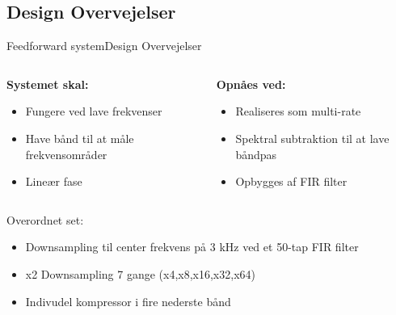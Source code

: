 \documentclass[10pt,aspectratio=169]{beamer}
\begin{document}
\subsection{Design Overvejelser}
\begin{frame}{Feedforward system}{Design Overvejelser}
\begin{columns}[t]
  \begin{column}{0.50\textwidth}
\textbf{Systemet skal:}
\begin{itemize}
\item Fungere ved lave frekvenser
\item Have bånd til at måle frekvensområder
\item Lineær fase
\end{itemize}
  \end{column}
  \begin{column}{0.50\textwidth}
  \textbf{Opnåes ved:}
\begin{itemize}
\item Realiseres som multi-rate
\item Spektral subtraktion til at lave båndpas
\item Opbygges af FIR filter
\end{itemize}
  \end{column}
\end{columns}
\vspace{5mm}
\begin{block}{Overordnet set:}
\begin{itemize}
\item Downsampling til center frekvens på 3 kHz ved et 50-tap FIR filter
\item x2 Downsampling 7 gange (x4,x8,x16,x32,x64)
\item Indivudel kompressor i fire nederste bånd
\end{itemize}
\end{block}
\end{frame}
\end{document}
